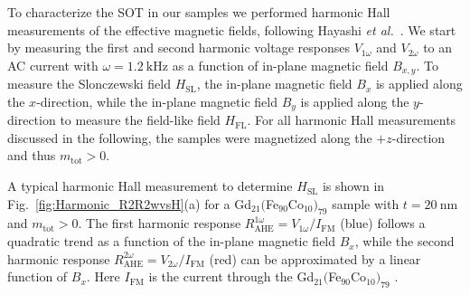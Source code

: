 \documentclass[aps,prb,superscriptaddress,sd,reprint]{revtex4-1}
\newcommand{\GdFeCo}{Gd$_{21}($Fe$_{90}$Co$_{10})_{79}$ }
\begin{document}
To characterize the SOT in our samples we performed harmonic Hall measurements of the effective magnetic fields, following Hayashi \textit{et al.}~\cite{Hayashi2014}. We start by measuring the first and second harmonic voltage responses $V_{1\omega}$ and $V_{2\omega}$ to an AC current with $\omega=\SI{1.2}{\kilo\hertz}$ as a function of in-plane magnetic field $B_{x,y}$. To measure the Slonczewski field $H_\text{SL}$, the in-plane magnetic field $B_x$ is applied along the $x$-direction, while the in-plane magnetic field $B_y$ is applied along the $y$-direction to measure the field-like field $H_\text{FL}$. For all harmonic Hall measurements discussed in the following, the samples were magnetized along the $+z$-direction and thus $m_\text{tot}>0$.

A typical harmonic Hall measurement to determine $H_\text{SL}$ is shown in Fig.~\ref{fig:Harmonic_R2R2wvsH}(a) for a \GdFeCo sample with $t=\SI{20}{\nano\meter}$ and $m_\text{tot}>0$. The first harmonic response $R^{1\omega}_\text{AHE}=V_{1\omega}/I_\text{FM}$ (blue) follows a quadratic trend as a function of the in-plane magnetic field $B_{x}$, while the second harmonic response $R^{2\omega}_\text{AHE}=V_{2\omega}/I_\text{FM}$ (red) can be approximated by a linear function of $B_x$. Here $I_\text{FM}$ is the current through the \GdFeCo.
\end{document}
